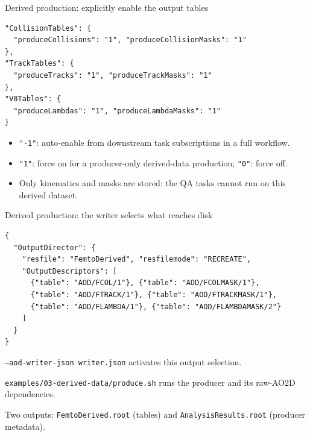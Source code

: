 \begin{frame}[fragile]{Derived production: explicitly enable the output tables}
 \begin{lstlisting}
"CollisionTables": {
  "produceCollisions": "1", "produceCollisionMasks": "1"
},
"TrackTables": {
  "produceTracks": "1", "produceTrackMasks": "1"
},
"V0Tables": {
  "produceLambdas": "1", "produceLambdaMasks": "1"
}
 \end{lstlisting}
 \begin{itemize}
 \item \texttt{"-1"}: auto-enable from downstream task subscriptions in a full workflow.
 \item \texttt{"1"}: force on for a producer-only derived-data production; \texttt{"0"}: force off.
 \item Only kinematics and masks are stored: the QA tasks cannot run on this derived dataset.
 \end{itemize}
\end{frame}

\begin{frame}[fragile]{Derived production: the writer selects what reaches disk}
 \begin{lstlisting}
{
  "OutputDirector": {
    "resfile": "FemtoDerived", "resfilemode": "RECREATE",
    "OutputDescriptors": [
      {"table": "AOD/FCOL/1"}, {"table": "AOD/FCOLMASK/1"},
      {"table": "AOD/FTRACK/1"}, {"table": "AOD/FTRACKMASK/1"},
      {"table": "AOD/FLAMBDA/1"}, {"table": "AOD/FLAMBDAMASK/2"}
    ]
  }
}
 \end{lstlisting}
 \small \texttt{--aod-writer-json writer.json} activates this output selection.\par\medskip
 \texttt{examples/03-derived-data/produce.sh} runs the producer and its raw-AO2D dependencies.\par\medskip
 Two outputs: \texttt{FemtoDerived.root} (tables) and \texttt{AnalysisResults.root} (producer metadata).
\end{frame}

